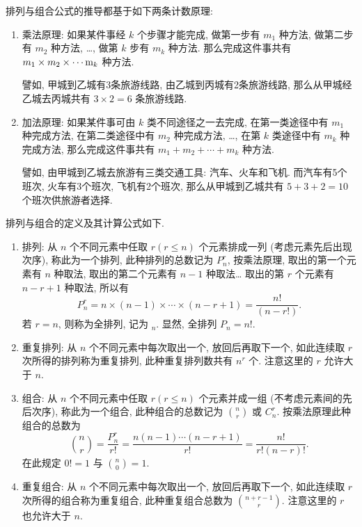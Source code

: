 排列与组合公式的推导都基于如下两条计数原理:
\begin{enumerate}
  \item 乘法原理:
  如果某件事经 $k$ 个步骤才能完成,
  做第一步有 $m_1$ 种方法,
  做第二步有 $m_2$ 种方法,
  \dots,
  做第 $k$ 步有 $m_k$ 种方法.
  那么完成这件事共有 $m_1 \times m_2 \times \dotsb \m_k$ 种方法.

  譬如,
  甲城到乙城有3条旅游线路,
  由乙城到丙城有2条旅游线路,
  那么从甲城经乙城去丙城共有 $3 \times 2 = 6$ 条旅游线路.

  \item 加法原理:
  如果某件事可由 $k$ 类不同途径之一去完成,
  在第一类途径中有 $m_1$ 种完成方法,
  在第二类途径中有 $m_2$ 种完成方法,
  \dots,
  在第 $k$ 类途径中有 $m_k$ 种完成方法,
  那么完成这件事共有 $m_1 + m_2 + \dotsb + m_k$ 种方法.

  譬如,
  由甲城到乙城去旅游有三类交通工具:
  汽车、火车和飞机.
  而汽车有5个班次,
  火车有3个班次,
  飞机有2个班次,
  那么从甲城到乙城共有 $5 + 3 + 2 = 10$ 个班次供旅游者选择.
\end{enumerate}

排列与组合的定义及其计算公式如下.
\begin{enumerate}
  \item 排列:
  从 $n$ 个不同元素中任取 $r (r \le n)$ 个元素排成一列 (考虑元素先后出现次序),
  称此为一个排列,
  此种排列的总数记为 $P_n^r$,
  按乘法原理,
  取出的第一个元素有 $n$ 种取法,
  取出的第二个元素有 $n - 1$ 种取法\dots
  取出的第 $r$ 个元素有 $n - r + 1$ 种取法,
  所以有
  \begin{equation}
    P_n^r = n \times (n - 1) \times \dotsb \times (n - r + 1) = \frac{n!}{(n - r!)}.\label{eq1.2.2}
  \end{equation}
  若 $r = n$,
  则称为全排列,
  记为 $_n$.
  显然,
  全排列 $P_n = n!$.

  \item 重复排列:
  从 $n$ 个不同元素中每次取出一个,
  放回后再取下一个,
  如此连续取 $r$ 次所得的排列称为重复排列,
  此种重复排列数共有 $n^r$ 个.
  注意这里的 $r$ 允许大于 $n$.

  \item 组合:
  从 $n$ 个不同元素中任取 $r (r \le n)$ 个元素并成一组 (不考虑元素间的先后次序),
  称此为一个组合,
  此种组合的总数记为 $\binom{n}{r}$ 或 $C_n^r$.
  按乘法原理此种组合的总数为
  \begin{equation}
    \binom{n}{r} = \frac{P_n^r}{r!} = \frac{n (n - 1) \dotsb (n - r + 1)}{r!} = \frac{n!}{r! (n - r)!}.\label{eq1.2.3}
  \end{equation}
  在此规定 $0! = 1$ 与 $\binom{n}{0} = 1$.

  \item 重复组合:
  从 $n$ 个不同元素中每次取出一个,
  放回后再取下一个,
  如此连续取 $r$ 次所得的组合称为重复组合,
  此种重复组合总数为 $\binom{n + r - 1}{r}$.
  注意这里的 $r$ 也允许大于 $n$.
\end{enumerate}

